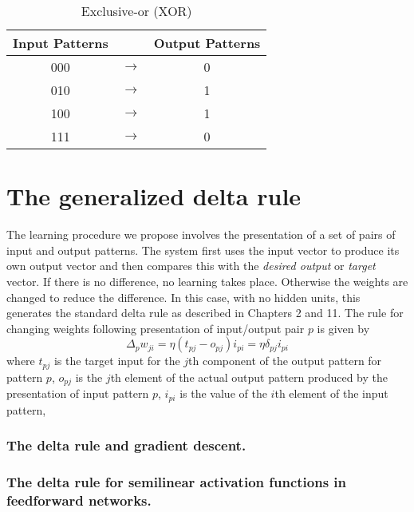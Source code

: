 \documentclass[10pt,letterpaper]{article}
\begin{document}
	\begin{table}[h]
	\label{table-2}
		\caption{Exclusive-or (XOR)}
		\begin{center}
			\begin{tabular}{ccc}
				\toprule
				Input Patterns & & Output Patterns \\
				\midrule
				000 & $\rightarrow$ & 0 \\
				010 & $\rightarrow$ & 1 \\
				100 & $\rightarrow$ & 1 \\
				111 & $\rightarrow$ & 0 \\
				\bottomrule
			\end{tabular}
		\end{center}
\end{table}
	
	\section{The generalized delta rule}
	The learning procedure we propose involves the presentation of a set of pairs of input and output patterns. The system first uses the input vector to produce its own output vector and then compares this with the \textit{desired output} or \textit{target} vector. If there is no difference, no learning takes place. Otherwise the weights are changed to reduce the difference. In this case, with no hidden units, this generates the standard delta rule as described in Chapters 2 and 11. The rule for changing weights following presentation of input/output pair $p$ is given by
	\begin{equation}
		\Delta_p w_{ji} = \eta (t_{pj} - o_{pj}) i_{pi} = \eta \delta_{pj} i_{pi}
	\end{equation}
	where $t_{pj}$ is the target input for the $j$th component of the output pattern for pattern $p$, $o_{pj}$ is the $j$th element of the actual output pattern produced by the presentation of input pattern $p$, $i_{pi}$ is the value of the $i$th element of the input pattern, 
	
	\subsubsection{The delta rule and gradient descent.}
	\subsubsection{The delta rule for semilinear activation functions in feedforward networks.}
	
\end{document}
